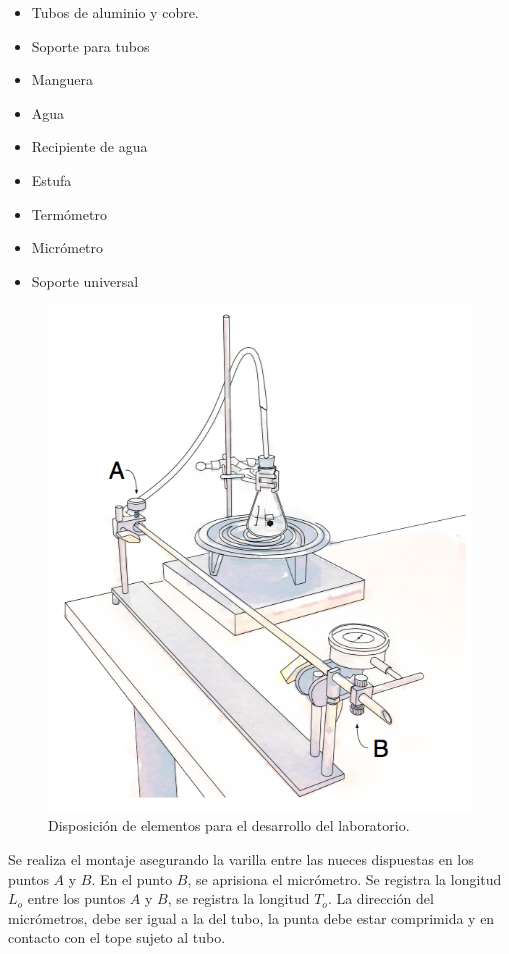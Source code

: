 \documentclass[DIV=calc, paper=a4, fontsize=11pt, twocolumn, spanish]{scrartcl}	 %
\begin{document}
\begin{itemize}
\item Tubos de aluminio y cobre.
\item Soporte para tubos
\item Manguera
\item Agua
\item Recipiente de agua
\item Estufa
\item Termómetro
\item Micrómetro
\item Soporte universal
\end{itemize}

\begin{figure}[htbp]
\centering
	\includegraphics[scale=0.8]{data/img/figure02}
	\caption{Disposición de elementos para el desarrollo del laboratorio.}
\end{figure}

Se realiza el montaje asegurando la varilla entre las nueces dispuestas en los puntos $A$ y $B$. En el punto $B$, se aprisiona el micrómetro. Se registra la longitud $L_o$ entre los puntos $A$ y $B$, se registra la longitud $T_o$. La dirección del micrómetros, debe ser igual a la del tubo, la punta debe estar comprimida y en contacto con el tope sujeto al tubo.\\
\end{document}
